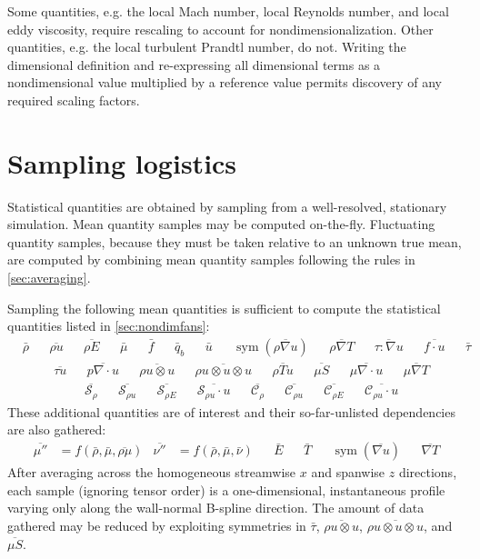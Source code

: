 \documentclass[letterpaper,11pt,nointlimits,reqno,draft]{amsbook}
\newcommand{\symmetricpart}[1]
  {\ensuremath{\operatorname{sym}\left(#1\right)}}
\newcommand{\Ssd}{\ensuremath{\mathcal{S}}} %
\newcommand{\Cs}{\ensuremath{\mathcal{C}}}  %
\begin{document}
Some quantities, e.g. the local Mach number, local Reynolds number, and local
eddy viscosity, require rescaling to account for nondimensionalization.  Other
quantities, e.g. the local turbulent Prandtl number, do not.  Writing the
dimensional definition and re-expressing all dimensional terms as a
nondimensional value multiplied by a reference value permits discovery of any
required scaling factors.

\section{Sampling logistics}
\label{sec:sampling}

Statistical quantities are obtained by sampling from a well-resolved,
stationary simulation.  Mean quantity samples may be computed on-the-fly.
Fluctuating quantity samples, because they must be taken relative to an unknown
true mean, are computed by combining mean quantity samples following the rules
in \autoref{sec:averaging}.

Sampling the following mean quantities is sufficient to compute
the statistical quantities listed in \autoref{sec:nondimfans}:
\begin{align}
&\bar{\rho}
&
&\overline{\rho{}u}
&
&\overline{\rho{}E}
&
&\bar{\mu}
&
&\bar{f}
&
&\bar{q}_b
&
&\bar{u}
&
&\symmetricpart{\overline{\rho\nabla{}u}}
&
&\overline{\rho\nabla{}T}
&
&\overline{\tau:\nabla{}u}
&
&\overline{f\cdot{}u}
&
&\bar{\tau}
\end{align}
\begin{align}
&\overline{\tau{}u}
&
&\overline{p\nabla\cdot{}u}
&
&\overline{\rho{}u\otimes{}u}
&
&\overline{\rho{}u\otimes{}u\otimes{}u}
&
&\overline{\rho{}Tu}
&
&\overline{\mu{}S}
&
&\overline{\mu\nabla\cdot{}u}
&
&\overline{\mu\nabla{}T}
\end{align}
\begin{align}
&\overline{\Ssd_{\rho{}}}
&
&\overline{\Ssd_{\rho{} u}}
&
&\overline{\Ssd_{\rho{} E}}
&
&\overline{\Ssd_{\rho{} u}\cdot{}u}
&
&\overline{\Cs_{\rho{}}}
&
&\overline{\Cs_{\rho{} u}}
&
&\overline{\Cs_{\rho{} E}}
&
&\overline{\Cs_{\rho{} u}\cdot{}u}
\end{align}
These additional quantities are of interest and their so-far-unlisted
dependencies are also gathered:
\begin{align}
  \overline{\mu{}''}&= f\left(
      \bar{\rho}, \bar{\mu}, \overline{\rho\mu}
  \right)
  &
  \overline{\nu{}''} &= f\left(
      \bar{\rho}, \bar{\mu}, \bar{\nu}
  \right)
  &
  &\bar{E}
  &
  &\bar{T}
  &
  &\symmetricpart{\overline{\nabla{}u}}
  &
  &\overline{\nabla{}T}
\end{align}
After averaging across the homogeneous streamwise $x$ and spanwise $z$
directions, each sample (ignoring tensor order) is a one-dimensional,
instantaneous profile varying only along the wall-normal B-spline direction.
The amount of data gathered may be reduced by exploiting symmetries in
$\bar{\tau}$, $\overline{\rho{}u\otimes{}u}$,
$\overline{\rho{}u\otimes{}u\otimes{}u}$, and $\overline{\mu{}S}$.
\end{document}
